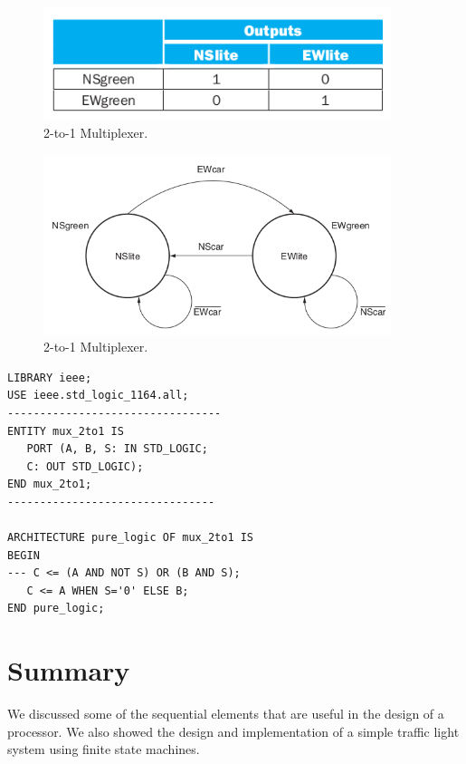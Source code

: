 \documentclass[a4paper, 11pt,oneside]{article}
\begin{document}
\begin{figure}[H]
	\begin{center}
	\includegraphics[width=4in]{fsm2.png}
	\caption{2-to-1 Multiplexer.}
	\label{fig:mux} 
	\end{center}
\end{figure}

\begin{figure}[H]
	\begin{center}
	\includegraphics[width=4in]{fsm3.png}
	\caption{2-to-1 Multiplexer.}
	\label{fig:mux} 
	\end{center}
\end{figure}



\begin{verbatim}
LIBRARY ieee;
USE ieee.std_logic_1164.all;
---------------------------------
ENTITY mux_2to1 IS
   PORT (A, B, S: IN STD_LOGIC;
   C: OUT STD_LOGIC);
END mux_2to1;
--------------------------------

ARCHITECTURE pure_logic OF mux_2to1 IS
BEGIN
--- C <= (A AND NOT S) OR (B AND S);                       
   C <= A WHEN S='0' ELSE B;
END pure_logic;
\end{verbatim}





\section{Summary}
We discussed some of the sequential elements that are useful in the design of a 
processor. We also showed the design and implementation of a simple traffic 
light system using finite state machines.
\end{document}
